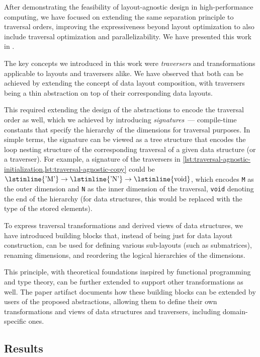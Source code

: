 After demonstrating the feasibility of layout-agnostic design in high-performance computing, we have focused on extending the same separation principle to traversal orders, improving the expressiveness beyond layout optimization to also include traversal optimization and parallelizability. We have presented this work in .

The key concepts we introduced in this work were \emph{traversers} and transformations applicable to layouts and traversers alike. We have observed that both can be achieved by extending the concept of data layout composition, with traversers being a thin abstraction on top of their corresponding data layouts.

This required extending the design of the abstractions to encode the traversal order as well, which we achieved by introducing \emph{signatures}~--- compile-time constants that specify the hierarchy of the dimensions for traversal purposes. In simple terms, the signature can be viewed as a tree structure that encodes the loop nesting structure of the corresponding traversal of a given data structure (or a traverser). For example, a signature of the traversers in \cref{lst:traversal-agnostic-initialization,lst:traversal-agnostic-copy} could be $\text{\lstinline{'M'}} \to \text{\lstinline{'N'}} \to \text{\lstinline{void}}$, which encodes \lstinline{M} as the outer dimension and \lstinline{N} as the inner dimension of the traversal, \lstinline{void} denoting the end of the hierarchy (for data structures, this would be replaced with the type of the stored elements).

To express traversal transformations and derived views of data structures, we have introduced building blocks that, instead of being just for data layout construction, can be used for defining various sub-layouts (such as submatrices), renaming dimensions, and reordering the logical hierarchies of the dimensions.

This principle, with theoretical foundations inspired by functional programming and type theory, can be further extended to support other transformations as well. The paper artifact documents how these building blocks can be extended by users of the proposed abstractions, allowing them to define their own transformations and views of data structures and traversers, including domain-specific ones.


\subsection{Results}\label{sec:traversal-agnostic-results}

